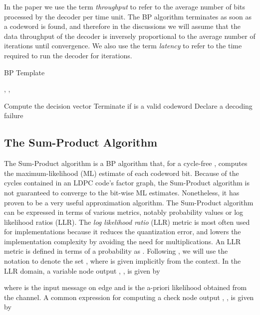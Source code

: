 \documentclass[12pt,journal,twoside,draftcls,onecolumn]{IEEEtran}
\begin{document}
In the paper we use the term \emph{throughput} to refer to the average number of bits processed by the decoder per time unit.
The BP algorithm terminates as soon as a codeword is found, and therefore in the discussions we will assume that the data throughput of the decoder is inversely proportional to the average number of iterations until convergence. We also use the term \emph{latency} to refer to the time required to run the decoder for  iterations.

\begin{algorithm}
\caption{BP Template}\label{alg_BP}
\begin{algorithmic}

	\State , 
	\State ,  
	
	
			\ForAll{}
				\State 
			\EndFor
		\EndFor
{}
			\ForAll{}
				\State 
			\EndFor
		\EndFor		
		\State Compute the decision vector 
		\State Terminate if  is a valid codeword
	\EndFor
	\State Declare a decoding failure
\EndProcedure
\end{algorithmic}
\end{algorithm}


\subsection{The Sum-Product Algorithm}
\label{sect_background_spa}

The Sum-Product algorithm is a BP algorithm that, for a cycle-free , computes the maximum-likelihood (ML) estimate of each codeword bit. 
Because of the cycles contained in an LDPC code's factor graph, the Sum-Product algorithm is not guaranteed to converge to the bit-wise ML estimates. Nonetheless, it has proven to be a very useful approximation algorithm.
The Sum-Product algorithm can be expressed in terms of various metrics, notably probability values or log likelihood ratios (LLR).
The \emph{log likelihood ratio} (LLR) metric is most often used for implementations because it reduces the quantization error,
and lowers the implementation complexity by avoiding the need for multiplications. An LLR metric  is defined in terms of a probability  as . Following \cite{kschischang:2001}, we will use the notation  to denote the set , where  is given implicitly from the context. 
In the LLR domain, a variable node output , , is given by

where  is the input message on edge  and  is the a-priori likelihood obtained from the channel.
A common expression for computing a check node output , , is given by
\end{document}

